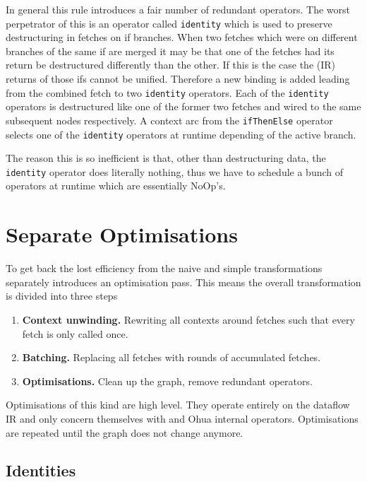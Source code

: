 In general this rule introduces a fair number of redundant operators.
The worst perpetrator of this is an operator called \texttt{identity} which is used to preserve destructuring in fetches on if branches.
When two fetches which were on different branches of the same if are merged it may be that one of the fetches had its return be destructured differently than the other.
If this is the case the (IR) returns of those ifs cannot be unified.
Therefore a new binding is added leading from the combined fetch to two \texttt{identity} operators.
Each of the \texttt{identity} operators is destructured like one of the former two fetches and wired to the same subsequent nodes respectively.
A context arc from the \texttt{ifThenElse} operator selects one of the \texttt{identity} operators at runtime depending of the active branch.

The reason this is so inefficient is that, other than destructuring data, the \texttt{identity} operator does literally nothing, thus we have to schedule a bunch of operators at runtime which are essentially NoOp's.

\section{Separate Optimisations}

To get back the lost efficiency from the naive and simple transformations \yauhau{} separately introduces an optimisation pass.
This means the overall transformation is divided into three steps

\begin{enumerate}
    \item \textbf{Context unwinding.} Rewriting all contexts around fetches such that every fetch is only called once.
    \item \textbf{Batching.} Replacing all fetches with rounds of accumulated fetches.
    \item \textbf{Optimisations.} Clean up the graph, remove redundant operators.
\end{enumerate}

Optimisations of this kind are high level.
They operate entirely on the dataflow IR and only concern themselves with \yauhau{} and Ohua internal operators.
Optimisations are repeated until the graph does not change anymore.


\subsection{Identities}

